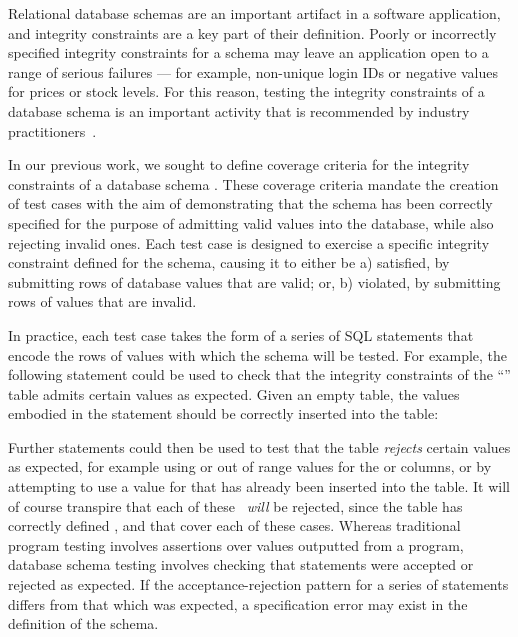 Relational database schemas are an important artifact in a software application, and integrity constraints are a key part of their definition. Poorly or incorrectly specified integrity constraints for a schema may leave an application open to a range of serious failures --- for example, non-unique login IDs or negative values for prices or stock levels. For this reason, testing the integrity constraints of a database schema is an important activity that is recommended by industry practitioners~\cite{DzoneDatabaseTesting}.

In our previous work, we sought to define coverage criteria for the integrity constraints of a database schema \cite{McMinn2015}. These coverage criteria mandate the creation of test cases with the aim of demonstrating that the schema has been correctly specified for the purpose of admitting valid values into the database, while also rejecting \mbox{invalid} ones. Each test case is designed to exercise a specific integrity constraint defined for the schema, causing it to either be a) satisfied, by submitting rows of database values that are valid; or, b) violated, by submitting rows of values that are invalid.

In practice, each test case takes the form of a series of SQL \INSERT statements that encode the rows of values with which the schema will be tested. For example, the following \INSERT statement could be used to check that the integrity constraints of the ``'' table admits certain values as expected. Given an empty table, the values embodied in the statement should be correctly inserted into the table:

\vspace{-.25em}
\begin{center}
\end{center}
\vspace{-.25em}

\begin{sloppypar}
Further \INSERT statements could then be used to test that the table {\it rejects} certain values as expected, for example using \NULL or out of range values for the  or  columns, or by attempting to use a value for  that has already been inserted into the table. 
%
It will of course transpire that each of these \INSERTs~{\it will} be rejected, since the table has correctly defined \NOTNULL, \CHECK and \PKCs that cover each of these cases.
%
Whereas traditional program testing involves assertions over values outputted from a program, database schema testing involves checking that \INSERT statements were accepted or rejected as expected. If the acceptance-rejection pattern for a series of \INSERT statements differs from that which was expected, a specification error may exist in the definition of the schema.
\end{sloppypar}

